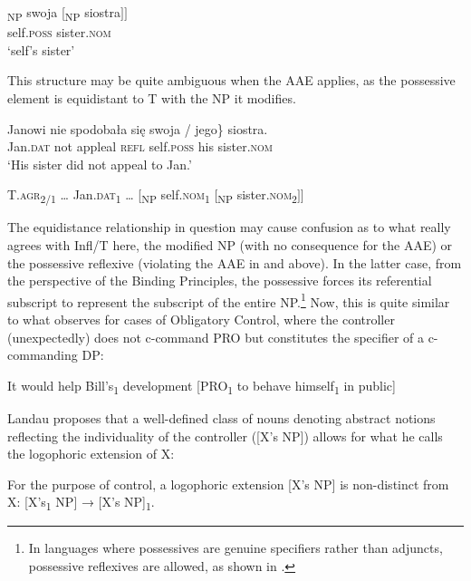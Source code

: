 \documentclass[output=paper,modfonts,nonflat
]{langsci/langscibook}
\begin{document}
\ea \label{ex:witkos:58}{
\gll {[}\textsubscript{NP} swoja [\textsubscript{NP} siostra$]]$\\
     {} self.\textsc{poss} {} sister.\textsc{nom}\\
\glt `self's sister'
}
\z
    
\noindent This structure may be quite ambiguous when the AAE applies, as the possessive element is equidistant to T with the NP it modifies.

\ea \label{ex:witkos:59}{
\gll Janowi nie spodobała się \minsp{\{*} swoja / jego\} siostra.\\
     Jan.\textsc{dat} not appleal \textsc{refl} {} self.\textsc{poss} {} his sister.\textsc{nom}\\
\glt `His sister did not appeal to Jan.'
}
\z

\ea \label{ex:witkos:60}
T.\textsc{agr}\textsubscript{2/1} {\dots} Jan.\textsc{dat}\textsubscript{1} {\dots} [\textsubscript{NP} self.\textsc{nom}\textsubscript{1} [\textsubscript{NP} sister.\textsc{nom}\textsubscript{2}$]]$\\
\z

\noindent The equidistance relationship in question may cause confusion as to what really agrees with Infl/T here, the modified NP (with no consequence for the AAE) or the possessive reflexive (violating the AAE in  and  above). In the latter case, from the perspective of the Binding Principles, the possessive forces its referential subscript to represent the subscript of the entire NP.\footnote{\label{fn31}In languages where possessives are genuine specifiers rather than adjuncts, possessive reflexives are allowed, as shown in \cite[273--274]{woolford1999}.} Now, this is quite similar to what \cite[109--111]{landau2000} observes for cases of Obligatory Control, where the controller (unexpectedly) does not c-command PRO but constitutes the specifier of a c-commanding DP:

\ea \label{ex:witkos:61}
It would help Bill’s\textsubscript{1} development [PRO\textsubscript{1} to behave himself\textsubscript{1} in public]\\
\z

\noindent Landau proposes that a well-defined class of nouns denoting abstract notions reflecting the individuality of the controller ([X’s NP]) allows for what he calls the logophoric extension of X:

\ea \label{ex:witkos:62}
For the purpose of control, a logophoric extension [X’s NP] is non-distinct from X: [X’s\textsubscript{1} NP] → [X’s NP]\textsubscript{1}.\\
\z
\end{document}
